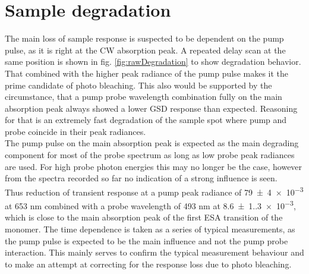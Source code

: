 \documentclass[twoside,openright]{scrreprt}
\begin{document}
\section{Sample degradation}\label{sec:degradation}
The main loss of sample response is suspected to be dependent on the pump pulse, as it is right at the CW absorption peak. A repeated delay scan at the same position is shown in fig. \ref{fig:rawDegradation} to show degradation behavior. That combined with the higher peak radiance of the pump pulse makes it the prime candidate of photo bleaching. This also would be supported by the circumstance, that a pump probe wavelength combination fully on the main absorption peak always showed a lower GSD response than expected. Reasoning for that is an extremely fast degradation of the sample spot where pump and probe coincide in their peak radiances.\\
The pump pulse on the main absorption peak is expected as the main degrading component for most of the probe spectrum as long as low probe peak radiances are used. For high probe photon energies this may no longer be the case, however from the spectra recorded so far no indication of a strong influence is seen.\\
Thus reduction of transient response at a pump peak radiance of \SI{79(4)e-3}{\radExp} at 653 nm combined with a probe wavelength of 493 nm at \SI{8.6(1.3)e-3}{\radExp}, which is close to the main absorption peak of the first ESA transition of the monomer. The time dependence is taken as a series of typical measurements, as the pump pulse is expected to be the main influence and not the pump probe interaction. This mainly serves to confirm the typical measurement behaviour and to make an attempt at correcting for the response loss due to photo bleaching.
\end{document}
